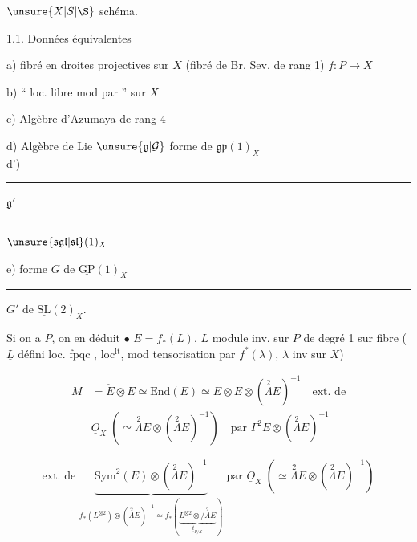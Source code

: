 
$\unsure{X|S|\text{\S}}$ schéma.

1.1. Données équivalentes

a) fibré en droites projectives  sur $X$ (fibré de Br. Sev. de rang 1) $f:P\longrightarrow X$

b) `` loc. libre  mod  par  '' sur $X$

c) Algèbre d'Azumaya  de rang 4


d) Algèbre de Lie $\unsure{\mathfrak g|\mathcal G}$ forme  de $\mathfrak{gp}(1)_X$\\
 d') \rule{2.1cm}{0.3pt} $\mathfrak g'$ \rule{2.1cm}{0.3pt}  $\unsure{\mathfrak{sgl}|\mathfrak{sl}}(1)_X$

e) forme $G$ de $\underline{\mathrm{GP}}(1)_X$\\
   \rule{1.5cm}{0.3pt} $G'$ de $\underline{\mathrm{SL}}(2)_X$.

Si on a $P$, on en déduit $\bullet$ $E=f_*(L)$, $\underline L$ module inv. sur $P$ de degré 1 sur  fibre ($\underline L$ défini loc. fpqc , loc$^{\mathrm{lt}}$, mod tensorisation par $f^*(\lambda)$, $\lambda$ inv sur $X$)

\[ \begin{aligned}
 M&=\check E\otimes E\simeq\underline{\mathrm{End}}(E)\simeq E\otimes E\otimes(\overset2\Lambda E)^{-1}\quad\text{ext. de}\\
 &\underline O_X\;(\simeq\overset2\Lambda E\otimes(\overset2\Lambda E)^{-1})\quad\text{par }\Gamma^2E\otimes(\overset2\Lambda E)^{-1}
 \end{aligned} \]

\[ \text{ext. de }\underbrace{\mathrm{Sym}^2(E)\otimes(\overset2\Lambda E)^{-1}}_{f_*(L^{\otimes2})\otimes(\overset2\Lambda E)^{-1}\simeq f_*(\underbrace{L^{\otimes2}\otimes/\overset2\Lambda E}_{\underline t_{P/X}})}
 \text{ par }\underline O_X\;(\simeq\overset2\Lambda E\otimes(\overset2\Lambda E)^{-1}) \]



